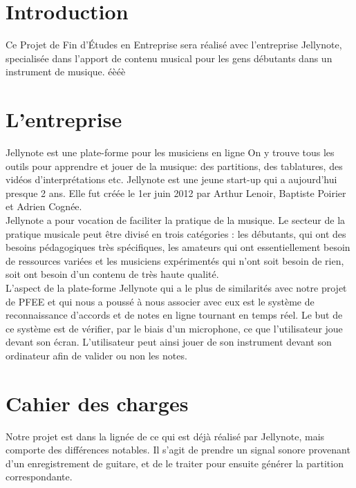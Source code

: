 \documentclass[12pt]{article}
\begin{document}


\newpage
\tableofcontents

\newpage
\clearpage
{}

\section{Introduction}

Ce Projet de Fin d'Études en Entreprise sera réalisé avec l'entreprise Jellynote, specialisée dans l'apport de contenu musical pour les gens débutants dans un instrument de musique. éèéè

\newpage
\section{L'entreprise}
Jellynote est une plate-forme pour les musiciens en ligne On y trouve tous les outils pour apprendre et jouer de la musique: des partitions, des tablatures, des vidéos d’interprétations etc. Jellynote est une jeune start-up qui a aujourd’hui presque 2 ans. Elle fut créée le 1er juin 2012 par Arthur Lenoir, Baptiste Poirier et Adrien Cognée.\\

Jellynote a pour vocation de faciliter la pratique de la musique. Le secteur de la pratique musicale peut être divisé en trois catégories : les débutants, qui ont des besoins pédagogiques très spécifiques, les amateurs qui ont essentiellement besoin de ressources variées et les musiciens expérimentés qui n’ont soit besoin de rien, soit ont besoin d’un contenu de très haute qualité.\\

L'aspect de la plate-forme Jellynote qui a le plus de similarités avec notre projet de PFEE et qui nous a poussé à nous associer avec eux est le système de reconnaissance d’accords et de notes en ligne tournant en temps réel. Le but de ce système est de vérifier, par le biais d’un microphone, ce que l’utilisateur joue devant son écran. L'utilisateur peut ainsi jouer de son instrument devant son ordinateur afin de valider ou non les notes.

\newpage
\section{Cahier des charges}

Notre projet est dans la lignée de ce qui est déjà réalisé par Jellynote, mais comporte des différences notables. Il s’agit de prendre un signal sonore provenant d’un enregistrement de guitare, et de le traiter pour ensuite générer la partition correspondante.\\
\end{document}
